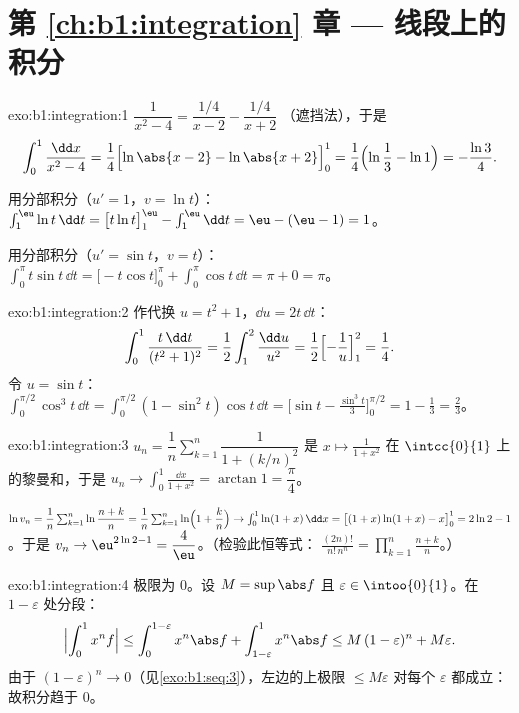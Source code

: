\section*{第 \ref{ch:b1:integration} 章 --- 线段上的积分}

\begin{solution}{exo:b1:integration:1}
$\dfrac{1}{x^2-4} = \dfrac{1/4}{x - 2} - \dfrac{1/4}{x+2}$
（遮挡法），于是
\[
\int_0^1 \frac{\dd x}{x^2 - 4}
= \frac14\Bigl[\ln\abs{x-2} - \ln\abs{x+2}\Bigr]_0^1
= \frac14\Bigl(\ln\frac{1}{3} - \ln 1\Bigr) = -\frac{\ln 3}{4}.
\]

用分部积分（$u' = 1$，$v = \ln t$）：$\int_1^{\eu} \ln t\,\dd t =
\bigl[t\ln t\bigr]_1^{\eu} - \int_1^{\eu} \dd t = \eu - (\eu - 1) =
1$。

用分部积分（$u' = \sin t$，$v = t$）：$\int_0^\pi t\sin t\,\dd t =
\bigl[-t\cos t\bigr]_0^\pi + \int_0^\pi \cos t\,\dd t = \pi + 0 =
\pi$。
\end{solution}

\begin{solution}{exo:b1:integration:2}
作代换 $u = t^2 + 1$，$\dd u = 2t\,\dd t$：
\[
\int_0^1 \frac{t\,\dd t}{(t^2+1)^2}
= \frac12 \int_1^2 \frac{\dd u}{u^2}
= \frac12\Bigl[-\frac1u\Bigr]_1^2 = \frac14 .
\]
令 $u = \sin t$：$\int_0^{\pi/2} \cos^3 t\,\dd t = \int_0^{\pi/2}
(1 - \sin^2 t)\cos t\,\dd t = \bigl[\sin t - \frac{\sin^3
t}{3}\bigr]_0^{\pi/2} = 1 - \frac13 = \frac23$。
\end{solution}

\begin{solution}{exo:b1:integration:3}
$u_n = \dfrac1n \sum_{k=1}^{n} \dfrac{1}{1 + (k/n)^2}$ 是
$x \mapsto \frac{1}{1+x^2}$ 在 $\intcc{0}{1}$ 上的黎曼和，于是 $u_n \to
\int_0^1 \frac{\dd x}{1+x^2} = \arctan 1 = \dfrac\pi4$。

$\ln v_n = \dfrac1n \sum_{k=1}^{n} \ln\dfrac{n+k}{n} = \dfrac 1n
\sum_{k=1}^n \ln\Bigl(1 + \dfrac kn\Bigr) \to \int_0^1 \ln(1+x)\,\dd
x = \bigl[(1+x)\ln(1+x) - x\bigr]_0^1 = 2\ln 2 - 1$。于是 $v_n \to
\eu^{2\ln 2 - 1} = \dfrac 4\eu$。（检验此恒等式：
$\frac{(2n)!}{n!\,n^n} = \prod_{k=1}^{n} \frac{n+k}{n}$。）
\end{solution}

\begin{solution}{exo:b1:integration:4}
极限为 $0$。设 $M = \sup \abs f$ 且 $\varepsilon \in
\intoo{0}{1}$。在 $1 - \varepsilon$ 处分段：
\[
\Bigl| \int_0^1 x^n f \Bigr|
\leq \int_0^{1 - \varepsilon} x^n \abs f + \int_{1-\varepsilon}^1
x^n \abs f
\leq M\,(1-\varepsilon)^n + M\varepsilon .
\]
由于 $(1 - \varepsilon)^n \to 0$（见\cref{exo:b1:seq:3}），左边的上极限
$\leq M\varepsilon$ 对每个 $\varepsilon$ 都成立：
故积分趋于 $0$。
\end{solution}

